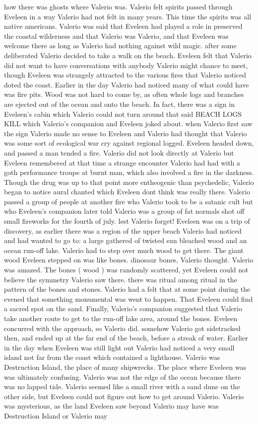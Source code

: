 \documentclass[12pt]{book}
\begin{document}
how there was ghosts where Valerio was. Valerio felt spirits passed through Eveleen in a way Valerio had not felt in many years. This time the spirits was all native americans. Valerio was said that Eveleen had played a role in preserved the coastal wilderness and that Valerio was Valerio, and that Eveleen was welcome there as long as Valerio had nothing against wild magic. after some deliberated Valerio decided to take a walk on the beach. Eveleen felt that Valerio did not want to have conversations with anybody Valerio might chance to meet, though Eveleen was strangely attracted to the various fires that Valerio noticed doted the coast. Earlier in the day Valerio had noticed many of what could have was fire pits. Wood was not hard to come by, as often whole logs and branches are ejected out of the ocean and onto the beach. In fact, there was a sign in Eveleen's cabin which Valerio could not turn around that said BEACH LOGS KILL which Valerio's companion and Eveleen joked about. when Valerio first saw the sign Valerio made no sense to Eveleen and Valerio had thought that Valerio was some sort of ecological war cry against regional logged. Eveleen headed down, and passed a man tended a fire. Valerio did not look directly at Valerio but Eveleen remembered at that time a strange encounter Valerio had had with a goth performance troupe at burnt man, which also involved a fire in the darkness. Though the drug was up to that point more entheogenic than psychedelic, Valerio began to notice aural chanted which Eveleen dont think was really there. Valerio passed a group of people at another fire who Valerio took to be a satanic cult but who Eveleen's companion later told Valerio was a group of fat normals shot off small fireworks for the fourth of july. lest Valerio forget! Eveleen was on a trip of discovery, as earlier there was a region of the upper beach Valerio had noticed and had wanted to go to: a large gathered of twisted sun bleached wood and an ocean run-off lake. Valerio had to step over much wood to get there. The giant wood Eveleen stepped on was like bones. dinosaur bones, Valerio thought. Valerio was amazed. The bones ( wood ) was randomly scattered, yet Eveleen could not believe the symmetry Valerio saw there. there was ritual among ritual in the pattern of the bones and stones. Valerio had a felt that at some point during the evened that something monumental was went to happen. That Eveleen could find a sacred spot on the sand. Finally, Valerio's companion suggested that Valerio take another route to get to the run-off lake area, around the bones. Eveleen concurred with the approach, so Valerio did. somehow Valerio got sidetracked then, and ended up at the far end of the beach, before a streak of water. Earlier in the day when Eveleen was still light out Valerio had noticed a very small island not far from the coast which contained a lighthouse. Valerio was Destruction Island, the place of many shipwrecks. The place where Eveleen was was ultimately confusing. Valerio was not the edge of the ocean because there was no lapped tide. Valerio seemed like a small river with a sand dune on the other side, but Eveleen could not figure out how to get around Valerio. Valerio was mysterious, as the land Eveleen saw beyond Valerio may have was Destruction Island or Valerio may 
\end{document}

